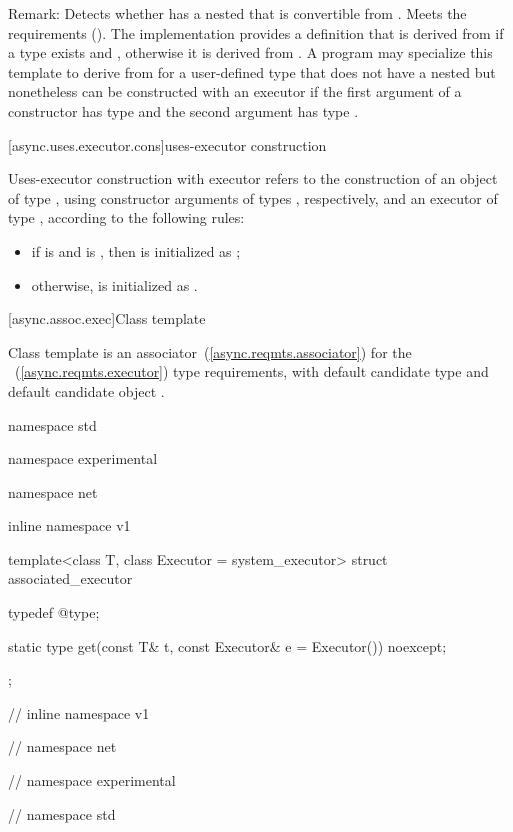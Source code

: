 \pnum
Remark: Detects whether  has a nested  that is convertible from . Meets the  requirements (). The implementation provides a definition that is derived from  if a type  exists and , otherwise it is derived from . A program may specialize this template to derive from  for a user-defined type  that does not have a nested  but nonetheless can be constructed with an executor if the first argument of a constructor has type  and the second argument has type .



[async.uses.executor.cons]{uses-executor construction}

\pnum
Uses-executor construction with executor  refers to the construction of an object  of type , using constructor arguments  of types , respectively, and an executor  of type , according to the following rules:

\begin{itemize}
\item
if  is  and  is , then  is initialized as ;

\item
otherwise,  is initialized as .
\end{itemize}




[async.assoc.exec]{Class template }

\pnum
Class template  is an associator~(\ref{async.reqmts.associator}) for the ~(\ref{async.reqmts.executor}) type requirements, with default candidate type  and default candidate object .

\begin{codeblock}
namespace std {
namespace experimental {
namespace net {
inline namespace v1 {

  template<class T, class Executor = system_executor>
  struct associated_executor
  {
    typedef @\seebelow@ type;

    static type get(const T& t, const Executor& e = Executor()) noexcept;
  };

} // inline namespace v1
} // namespace net
} // namespace experimental
} // namespace std
\end{codeblock}

